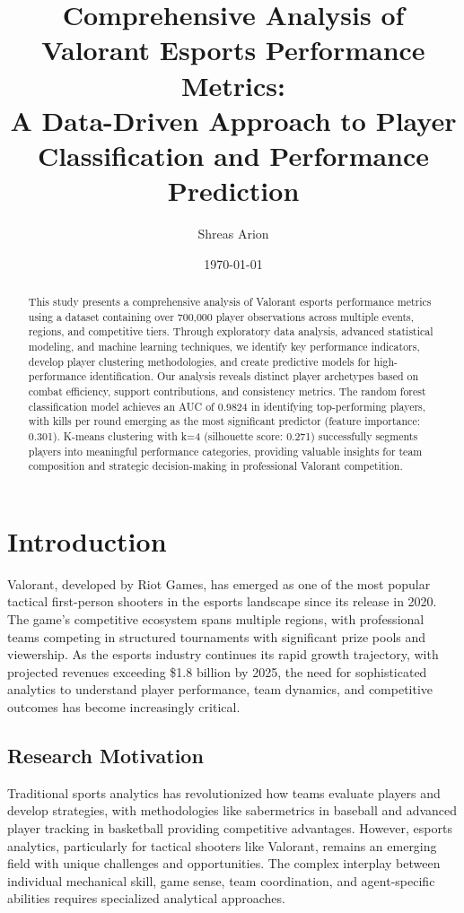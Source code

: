 \documentclass[11pt,a4paper]{article}
\title{Comprehensive Analysis of Valorant Esports Performance Metrics:\\A Data-Driven Approach to Player Classification and Performance Prediction}
\author{Shreas Arion}
\date{\today}
\begin{document}
\maketitle

\begin{abstract}
This study presents a comprehensive analysis of Valorant esports performance metrics using a dataset containing over 700,000 player observations across multiple events, regions, and competitive tiers. Through exploratory data analysis, advanced statistical modeling, and machine learning techniques, we identify key performance indicators, develop player clustering methodologies, and create predictive models for high-performance identification. Our analysis reveals distinct player archetypes based on combat efficiency, support contributions, and consistency metrics. The random forest classification model achieves an AUC of 0.9824 in identifying top-performing players, with kills per round emerging as the most significant predictor (feature importance: 0.301). K-means clustering with k=4 (silhouette score: 0.271) successfully segments players into meaningful performance categories, providing valuable insights for team composition and strategic decision-making in professional Valorant competition.
\end{abstract}

\section{Introduction}

Valorant, developed by Riot Games, has emerged as one of the most popular tactical first-person shooters in the esports landscape since its release in 2020. The game's competitive ecosystem spans multiple regions, with professional teams competing in structured tournaments with significant prize pools and viewership. As the esports industry continues its rapid growth trajectory, with projected revenues exceeding \$1.8 billion by 2025, the need for sophisticated analytics to understand player performance, team dynamics, and competitive outcomes has become increasingly critical.

\subsection{Research Motivation}

Traditional sports analytics has revolutionized how teams evaluate players and develop strategies, with methodologies like sabermetrics in baseball and advanced player tracking in basketball providing competitive advantages. However, esports analytics, particularly for tactical shooters like Valorant, remains an emerging field with unique challenges and opportunities. The complex interplay between individual mechanical skill, game sense, team coordination, and agent-specific abilities requires specialized analytical approaches.
\end{document}
